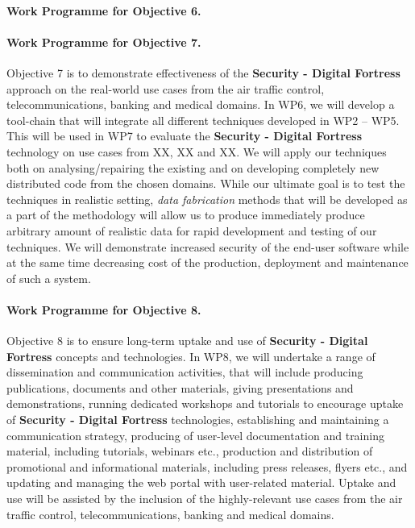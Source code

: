 \documentclass[a4paper,11pt]{article}
\newcommand{\project}[1]{\textbf{#1}\xspace}
\newcommand{\SECURITY}{\project{Security - Digital Fortress}}
\newcommand{\TheProject}{\SECURITY}
\begin{document}
\paragraph{Work Programme for Objective 6.}

\paragraph{Work Programme for Objective 7.} 

Objective 7 is to demonstrate effectiveness of the \TheProject{} approach on the real-world use cases from the air traffic control, telecommunications, banking and medical domains. In WP6, we will develop a tool-chain that will integrate all different techniques developed in WP2 -- WP5. This will be used in WP7 to evaluate the \TheProject{} technology  on use cases from XX, XX and XX. We will apply our techniques both on analysing/repairing the existing and on developing completely new distributed code from the chosen domains. While our ultimate goal is to test the techniques in realistic setting, \emph{data fabrication} methods that will be developed as a part of the methodology will allow us to produce immediately produce arbitrary amount of realistic data for rapid development and testing of our techniques. We will demonstrate increased security of the end-user software while at the same time decreasing cost of the production, deployment and maintenance of such a system.

\paragraph{Work Programme for Objective 8.}

Objective 8 is to ensure long-term uptake and use of \TheProject{} concepts and technologies. In WP8, we will undertake a range of dissemination and communication activities, that will include producing publications, documents and other materials, giving presentations and demonstrations, running dedicated workshops and tutorials to encourage uptake of \TheProject{} technologies, establishing and maintaining a communication strategy, producing of user-level documentation and training material, including tutorials, webinars etc., production and distribution of promotional and informational materials, including press releases, flyers etc., and updating and managing the web portal with user-related material. Uptake and use will be assisted by the inclusion of the highly-relevant use cases from the air traffic control, telecommunications, banking and medical domains.
\end{document}
